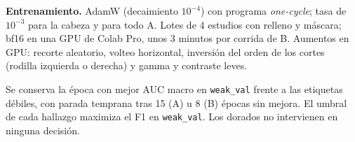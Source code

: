 \textbf{Entrenamiento.} AdamW (decaimiento $10^{-4}$) con programa \emph{one-cycle}; tasa de
$10^{-3}$ para la cabeza y para todo A. Lotes de 4 estudios con relleno y máscara; bf16 en una
GPU de Colab Pro, unos 3 minutos por corrida de B. Aumentos en GPU: recorte aleatorio, volteo
horizontal, inversión del orden de los cortes (rodilla izquierda o derecha) y gamma y
contraste leves.

Se conserva la época con mejor AUC macro en \texttt{weak\_val} frente a las etiquetas
débiles, con parada temprana tras 15 (A) u 8 (B) épocas sin mejora. El umbral de cada
hallazgo maximiza el F1 en \texttt{weak\_val}. Los dorados no intervienen en ninguna
decisión.
